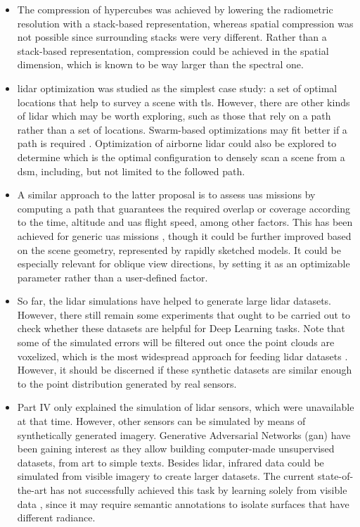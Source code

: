 \begin{itemize}
    \item The compression of hypercubes was achieved by lowering the radiometric resolution with a stack-based representation, whereas spatial compression was not possible since surrounding stacks were very different. Rather than a stack-based representation, compression could be achieved in the spatial dimension, which is known to be way larger than the spectral one. 
    \item \acrshort{lidar} optimization was studied as the simplest case study: a set of optimal locations that help to survey a scene with \acrshort{tls}. However, there are other kinds of \acrshort{lidar} which may be worth exploring, such as those that rely on a path rather than a set of locations. Swarm-based optimizations may fit better if a path is required \cite{roberge_fast_2018}. Optimization of airborne \acrshort{lidar} could also be explored to determine which is the optimal configuration to densely scan a scene from a \acrshort{dsm}, including, but not limited to the followed path.
    \item A similar approach to the latter proposal is to assess \acrshort{uas} missions by computing a path that guarantees the required overlap or coverage according to the time, altitude and \acrshort{uas} flight speed, among other factors. This has been achieved for generic \acrshort{uas} missions \cite{pessacg_simplifying_2022}, though it could be further improved based on the scene geometry, represented by rapidly sketched models. It could be especially relevant for oblique view directions, by setting it as an optimizable parameter rather than a user-defined factor. 
    \item So far, the \acrshort{lidar} simulations have helped to generate large \acrshort{lidar} datasets. However, there still remain some experiments that ought to be carried out to check whether these datasets are helpful for Deep Learning tasks. Note that some of the simulated errors will be filtered out once the point clouds are voxelized, which is the most widespread approach for feeding \acrshort{lidar} datasets \cite{hackel_semantic3d_2017, behley_towards_2021}. However, it should be discerned if these synthetic datasets are similar enough to the point distribution generated by real sensors. 
    \item Part IV only explained the simulation of \acrshort{lidar} sensors, which were unavailable at that time. However, other sensors can be simulated by means of synthetically generated imagery. Generative Adversarial Networks (\acrshort{gan}) have been gaining interest as they allow building computer-made unsupervised datasets, from art to simple texts. Besides \acrshort{lidar}, infrared data could be simulated from visible imagery to create larger datasets. The current state-of-the-art has not successfully achieved this task by learning solely from visible data \cite{li_multi-branch_2019, li_i-gans_2021, kniaz_thermalgan_2019, ozkanoglu_infragan_2022, yi_cycle_2023}, since it may require semantic annotations to isolate surfaces that have different radiance. 

\end{itemize}
